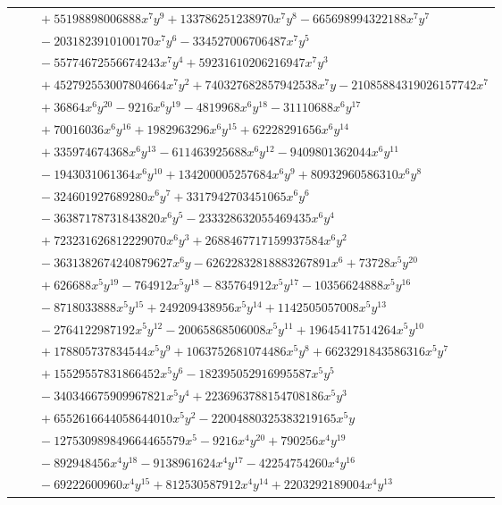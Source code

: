 \documentclass[11pt]{article}
\begin{document}
\begin{longtable}{@{}ll@{}}
 & $\quad +55198898006888x^{7}y^{9}+133786251238970x^{7}y^{8}-665698994322188x^{7}y^{7}$\\
 & $\quad -2031823910100170x^{7}y^{6}-334527006706487x^{7}y^{5}$\\
 & $\quad -55774672556674243x^{7}y^{4}+59231610206216947x^{7}y^{3}$\\
 & $\quad +452792553007804664x^{7}y^{2}+740327682857942538x^{7}y-21085884319026157742x^{7}$\\
 & $\quad +36864x^{6}y^{20}-9216x^{6}y^{19}-4819968x^{6}y^{18}-31110688x^{6}y^{17}$\\
 & $\quad +70016036x^{6}y^{16}+1982963296x^{6}y^{15}+62228291656x^{6}y^{14}$\\
 & $\quad +335974674368x^{6}y^{13}-611463925688x^{6}y^{12}-9409801362044x^{6}y^{11}$\\
 & $\quad -1943031061364x^{6}y^{10}+134200005257684x^{6}y^{9}+80932960586310x^{6}y^{8}$\\
 & $\quad -324601927689280x^{6}y^{7}+3317942703451065x^{6}y^{6}$\\
 & $\quad -36387178731843820x^{6}y^{5}-233328632055469435x^{6}y^{4}$\\
 & $\quad +723231626812229070x^{6}y^{3}+2688467717159937584x^{6}y^{2}$\\
 & $\quad -3631382674240879627x^{6}y-62622832818883267891x^{6}+73728x^{5}y^{20}$\\
 & $\quad +626688x^{5}y^{19}-764912x^{5}y^{18}-835764912x^{5}y^{17}-10356624888x^{5}y^{16}$\\
 & $\quad -8718033888x^{5}y^{15}+249209438956x^{5}y^{14}+1142505057008x^{5}y^{13}$\\
 & $\quad -2764122987192x^{5}y^{12}-20065868506008x^{5}y^{11}+19645417514264x^{5}y^{10}$\\
 & $\quad +178805737834544x^{5}y^{9}+1063752681074486x^{5}y^{8}+6623291843586316x^{5}y^{7}$\\
 & $\quad +15529557831866452x^{5}y^{6}-182395052916995587x^{5}y^{5}$\\
 & $\quad -340346675909967821x^{5}y^{4}+2236963788154708186x^{5}y^{3}$\\
 & $\quad +6552616644058644010x^{5}y^{2}-22004880325383219165x^{5}y$\\
 & $\quad -127530989849664465579x^{5}-9216x^{4}y^{20}+790256x^{4}y^{19}$\\
 & $\quad -892948456x^{4}y^{18}-9138961624x^{4}y^{17}-42254754260x^{4}y^{16}$\\
 & $\quad -69222600960x^{4}y^{15}+812530587912x^{4}y^{14}+2203292189004x^{4}y^{13}$\\

\end{longtable}
\end{document}
